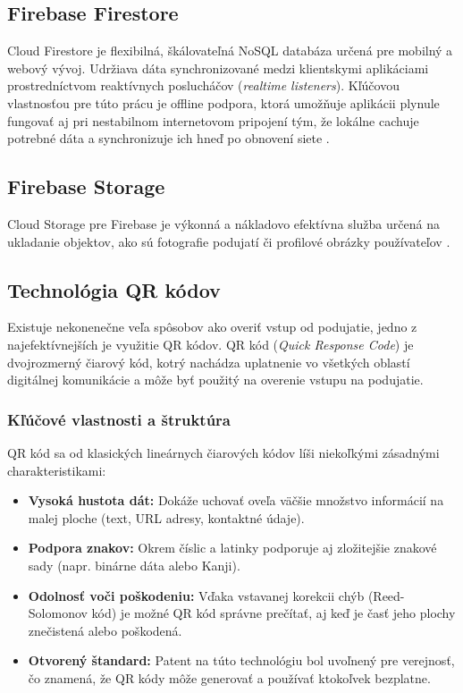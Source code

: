 \subsection{Firebase Firestore}
Cloud Firestore je flexibilná, škálovateľná NoSQL databáza určená pre mobilný a webový vývoj. 
Udržiava dáta synchronizované medzi klientskymi aplikáciami prostredníctvom reaktívnych poslucháčov (\textit{realtime listeners}). 
Kľúčovou vlastnosťou pre túto prácu je offline podpora, 
ktorá umožňuje aplikácii plynule fungovať aj pri nestabilnom internetovom pripojení 
tým, že lokálne cachuje potrebné dáta a synchronizuje ich hneď po obnovení siete \cite{firebase_firestore_docs}.


\subsection{Firebase Storage}
Cloud Storage pre Firebase je výkonná a nákladovo efektívna služba určená na ukladanie objektov, 
ako sú fotografie podujatí či profilové obrázky používateľov  \cite{firebase_firestore_docs}. 

\subsection{Technológia QR kódov}
Existuje nekonenečne veľa spôsobov ako overiť vstup od podujatie, jedno z najefektívnejších je využitie QR kódov.
QR kód (\textit{Quick Response Code}) je dvojrozmerný čiarový kód, kotrý nachádza uplatnenie vo všetkých oblastí digitálnej komunikácie a môže
byť použitý na overenie vstupu na podujatie.

\subsubsection{Kľúčové vlastnosti a štruktúra}
QR kód sa od klasických lineárnych čiarových kódov líši niekoľkými zásadnými charakteristikami:
\begin{itemize}[noitemsep, topsep=0pt]
    \item \textbf{Vysoká hustota dát:} Dokáže uchovať oveľa väčšie množstvo informácií na malej ploche (text, URL adresy, kontaktné údaje).
    \item \textbf{Podpora znakov:} Okrem číslic a latinky podporuje aj zložitejšie znakové sady (napr. binárne dáta alebo Kanji).
    \item \textbf{Odolnosť voči poškodeniu:} Vďaka vstavanej korekcii chýb (Reed-Solomonov kód) je možné QR kód správne prečítať, aj keď je časť jeho plochy znečistená alebo poškodená.
    \item \textbf{Otvorený štandard:} Patent na túto technológiu bol uvoľnený pre verejnosť, čo znamená, že QR kódy môže generovať a používať ktokoľvek bezplatne.
\end{itemize}

